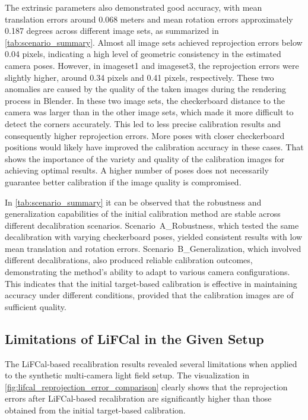 \documentclass[12pt]{scrartcl}
\begin{document}
The extrinsic parameters also demonstrated good accuracy, with mean translation errors around 0.068 meters and mean rotation errors approximately 0.187 degrees across different image sets, as summarized in \autoref{tab:scenario_summary}. Almost all image sets achieved reprojection errors below 0.04 pixels, indicating a high level of geometric consistency in the estimated camera poses. However, in imageset1 and imageset3, the reprojection errors were slightly higher, around 0.34 pixels and 0.41 pixels, respectively. These two anomalies are caused by the quality of the taken images during the rendering process in Blender. In these two image sets, the checkerboard distance to the camera was larger than in the other image sets, which made it more difficult to detect the corners accurately. This led to less precise calibration results and consequently higher reprojection errors. More poses with closer checkerboard positions would likely have improved the calibration accuracy in these cases. That shows the importance of the variety and quality of the calibration images for achieving optimal results. A higher number of poses does not necessarily guarantee better calibration if the image quality is compromised.
\newline

In \autoref{tab:scenario_summary} it can be observed that the robustness and generalization capabilities of the initial calibration method are stable across different decalibration scenarios. Scenario~A\_Robustness, which tested the same decalibration with varying checkerboard poses, yielded consistent results with low mean translation and rotation errors. Scenario~B\_Generalization, which involved different decalibrations, also produced reliable calibration outcomes, demonstrating the method's ability to adapt to various camera configurations. This indicates that the initial target-based calibration is effective in maintaining accuracy under different conditions, provided that the calibration images are of sufficient quality. 


\subsection{Limitations of LiFCal in the Given Setup}

The LiFCal-based recalibration results revealed several limitations when applied to the synthetic multi-camera light field setup. The visualization in \autoref{fig:lifcal_reprojection_error_comparison} clearly shows that the reprojection errors after LiFCal-based recalibration are significantly higher than those obtained from the initial target-based calibration. 
\newline
\end{document}
